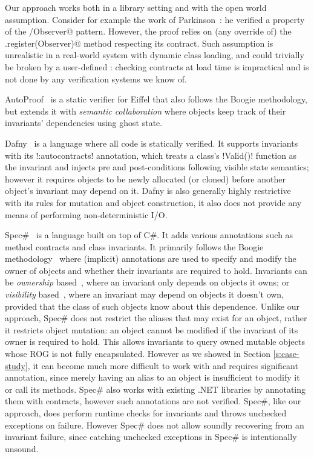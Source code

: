 Our approach works both  in a library setting and with the open world assumption.
Consider for example the work of Parkinson~\cite{parkinson2007class}: he verified a property of the \Q@Subject/Observer@ pattern. However, the proof relies on (any override of) the \Q@Subject.register(Observer)@ method respecting its contract. Such assumption is unrealistic in a real-world system with dynamic class loading, and could trivially be broken by a user-defined \Q@EvilSubject@: checking contracts at load time is impractical and is not done by any verification systems we know of.

AutoProof~\cite{DBLP:conf/fm/PolikarpovaTFM14} is a static verifier for Eiffel that also follows the Boogie methodology, but extends it with \emph{semantic collaboration} where objects keep track of their invariants' dependencies using ghost state.

Dafny~\cite{DBLP:conf/sigada/Leino12} is a language where all code is statically verified. It supports invariants with its \Q!{:autocontracts}! annotation, which treats a class's \Q!Valid()! function as the invariant and injects pre and post-conditions following visible state semantics;
however it requires objects to be newly allocated (or cloned) before another object's invariant may depend on it.
Dafny is also generally highly restrictive with its rules for mutation and object construction, it also does not provide any means of performing 
non-deterministic I/O.

Spec\#~\cite{Barnett:2004:SPS:2131546.2131549} is a language built on top of C\#. It adds various annotations such as method contracts and class invariants. 
It primarily follows the Boogie methodology~\cite{DBLP:journals/tcs/NaumannB06} where (implicit) annotations are used to specify and modify the owner of objects and whether their invariants are required to hold. Invariants can be \emph{ownership} based~\cite{DBLP:journals/jot/BarnettDFLS04}, where an invariant only depends on objects it owns; or \emph{visibility} based~\cite{DBLP:conf/mpc/BarnettN04,DBLP:conf/ecoop/LeinoM04}, where an invariant may depend on objects it doesn't own, provided that the class of such objects know about this dependence. Unlike our approach, Spec\# does not restrict the aliases that may exist for an object, rather it restricts object mutation: an object cannot be modified if the invariant of its owner is required to hold. This 
allows invariants to query owned mutable objects whose ROG is not fully encapsulated. However as we showed in Section \ref{s:case-study}, it can become much more difficult to work with and requires significant annotation, since merely having an alias to an object
is insufficient to modify it or call its methods.
Spec\# also works with existing .NET libraries by annotating them with contracts, however such annotations are not verified. Spec\#, like our approach, does perform runtime checks for invariants and throws unchecked exceptions on failure.  However Spec\# does not allow soundly recovering from an invariant failure, since catching unchecked exceptions in Spec\# is intentionally unsound.~\cite{Leino2004ExceptionSF}




